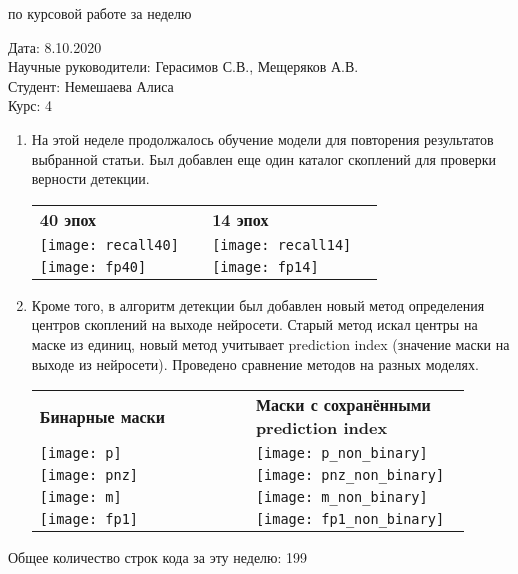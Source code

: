 \documentclass{article}
\begin{document}
\begin{center}{ по курсовой работе за неделю\\}\end{center}
Дата: 8.10.2020\\
Научные руководители: Герасимов С.В., Мещеряков А.В.\\
Студент: Немешаева Алиса\\
Курс: 4\\

\renewcommand{\labelitemi}{$\blacksquare$}
\renewcommand\labelitemii{$\square$}
\begin{enumerate}
    \item На этой неделе продолжалось обучение модели для повторения результатов выбранной статьи. 
        Был добавлен еще один каталог скоплений для проверки верности детекции.\\
    
    \begin{table}[h!]
        \begin{tabular}{p{0.45\linewidth}p{0.45\linewidth}}
            \textbf{40 эпох} & \textbf{14 эпох}\\
            \texttt{[image: recall40]} & \texttt{[image: recall14]}\\ 
            \texttt{[image: fp40]} & \texttt{[image: fp14]}\\ 
        \end{tabular}
    \end{table}

    \item Кроме того, в алгоритм детекции был добавлен новый метод определения центров скоплений на 
        выходе нейросети. Старый метод искал центры на маске из единиц, новый метод учитывает 
        prediction index (значение маски на выходе из нейросети). Проведено сравнение методов на 
        разных моделях.\\

    \begin{table}[h!]
        \begin{tabular}{p{0.45\linewidth}p{0.45\linewidth}}
            \textbf{Бинарные маски} & \textbf{Маски с сохранёнными prediction index}\\
            \texttt{[image: p]} & \texttt{[image: p\_non\_binary]}\\ 
            \texttt{[image: pnz]} & \texttt{[image: pnz\_non\_binary]}\\ 
            \texttt{[image: m]} & \texttt{[image: m\_non\_binary]}\\ 
            \texttt{[image: fp1]} & \texttt{[image: fp1\_non\_binary]}\\ 
        \end{tabular}
    \end{table}
\end{enumerate}

Общее количество строк кода за эту неделю: 199\\
\end{document}

